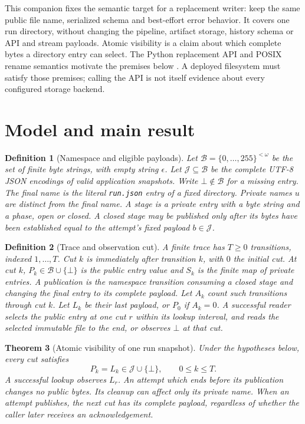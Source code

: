 \documentclass[12pt]{article}
\newtheorem{theorem}{Theorem}
\newtheorem{definition}[theorem]{Definition}
\newcommand{\Bytes}{\mathcal{B}}
\newcommand{\Valid}{\mathcal{J}}
\newcommand{\absent}{\bot}
\begin{document}
This companion fixes the semantic target for a replacement writer:
keep the same public file name, serialized schema and best-effort error
behavior. It covers one run directory, without changing the pipeline,
artifact storage, history schema or API and stream payloads. Atomic
visibility is a claim about which complete bytes a directory entry can
select. The Python replacement API and POSIX rename semantics motivate
the premises below \cite{python, posix}. A deployed filesystem must
satisfy those premises; calling the API is not itself evidence about
every configured storage backend.

\section{Model and main result}
\label{sec:model}
\begin{definition}[Namespace and eligible payloads]
\label{def:states}
Let $\Bytes=\{0,\ldots,255\}^{<\omega}$ be the set of finite byte
strings, with empty string $\epsilon$. Let $\Valid\subseteq\Bytes$
be the complete UTF-8 JSON encodings of valid application snapshots.
Write $\absent\notin\Bytes$ for a missing entry. The final name is
the literal \texttt{run.json} entry of a fixed directory. Private names
$u$ are distinct from the final name. A stage is a private entry with
a byte string and a phase, open or closed. A closed stage may be
published only after its bytes have been established equal to the
attempt's fixed payload $b\in\Valid$.
\end{definition}

\begin{definition}[Trace and observation cut]
\label{def:trace}
A finite trace has $T\geq0$ transitions, indexed $1,\ldots,T$.
Cut $k$ is immediately after transition $k$, with $0$ the initial cut.
At cut $k$, $P_k\in\Bytes\cup\{\absent\}$ is the public entry value
and $S_k$ is the finite map of private entries. A publication is the
namespace transition consuming a closed stage and changing the final
entry to its complete payload. Let $A_k$ count such transitions through
cut $k$. Let $L_k$ be their last payload, or $P_0$ if $A_k=0$.
A successful reader selects the public entry at one cut $r$ within
its lookup interval, and reads the selected immutable file to the end,
or observes $\absent$ at that cut.
\end{definition}

\begin{theorem}[Atomic visibility of one run snapshot]
\label{thm:visibility}
Under the hypotheses below, every cut satisfies
\begin{equation}
  P_k=L_k\in\Valid\cup\{\absent\}, \qquad 0\le k\le T .
\end{equation}
A successful lookup observes $L_r$.
An attempt which ends before its publication changes no public bytes.
Its cleanup can affect only its private name. When an attempt
publishes, the next cut has its complete payload, regardless of
whether the caller later receives an acknowledgement.
\end{theorem}
\end{document}
